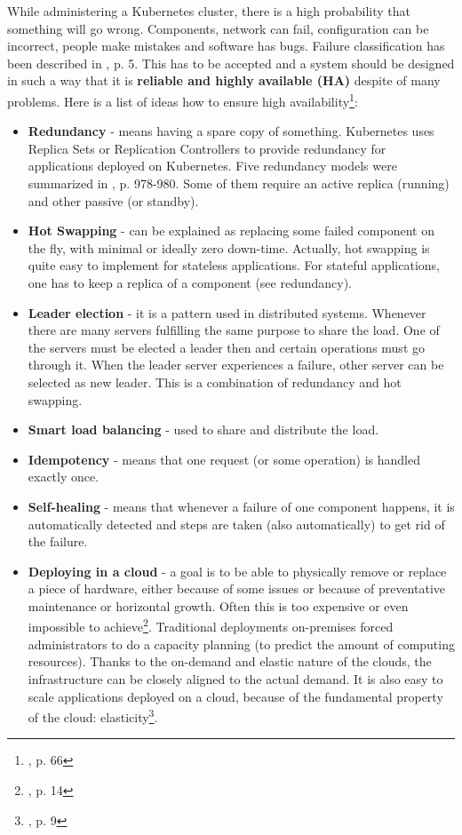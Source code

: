 While administering a Kubernetes cluster, there is a high probability that something will go wrong. Components, network can fail, configuration can be incorrect, people make mistakes and software has bugs. Failure classification has been described in \cite{article-failures}, p. 5. This has to be accepted and a system should be designed in such a way that it is \textbf{reliable and highly available (HA)} despite of many problems. Here is a list of ideas how to ensure high availability\footnote{\cite{book-mastering-k8s}, p. 66}:
\begin{itemize}
\item \textbf{Redundancy} - means having a spare copy of something. Kubernetes uses Replica Sets or Replication Controllers to provide redundancy for applications deployed on Kubernetes. Five redundancy models were summarized in \cite{article-redundancy-models}, p. 978-980. Some of them require an active replica (running) and other passive (or standby).
\item \textbf{Hot Swapping} - can be explained as replacing some failed component on the fly, with minimal or ideally zero down-time. Actually, hot swapping is quite easy to implement for stateless applications. For stateful applications, one has to keep a replica of a component (see redundancy).
\item \textbf{Leader election} - it is a pattern used in distributed systems. Whenever there are many servers fulfilling the same purpose to share the load. One of the servers must be elected a leader then and certain operations must go through it. When the leader server experiences a failure, other server can be selected as new leader. This is a combination of redundancy and hot swapping.
\item \textbf{Smart load balancing} - used to share and distribute the load.
\item \textbf{Idempotency} - means that one request (or some operation) is handled exactly once.
\item \textbf{Self-healing} - means that whenever a failure of one component happens, it is automatically detected and steps are taken (also automatically) to get rid of the failure.
\item \textbf{Deploying in a cloud} - a goal is to be able to physically remove or replace a piece of hardware, either because of some issues or because of preventative maintenance or horizontal growth. Often this is too expensive or even impossible to achieve\footnote{\cite{article-failures}, p. 14}. Traditional deployments on-premises forced administrators to do a capacity planning (to predict the amount of computing resources). Thanks to the on-demand and elastic nature of the clouds, the infrastructure can be closely aligned to the actual demand. It is also easy to scale applications deployed on a cloud, because of the fundamental property of the cloud: elasticity\footnote{\cite{article-aws-architecting}, p. 9}.
\end{itemize}

